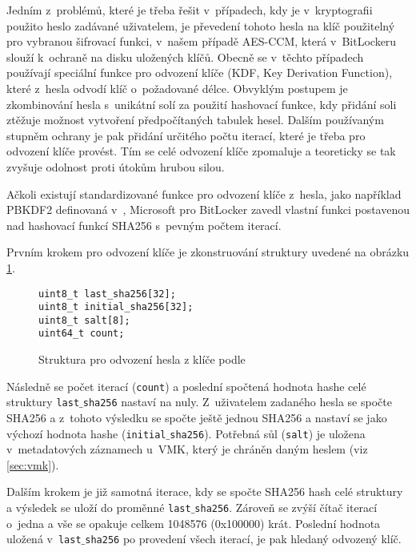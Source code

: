 \label{sec:kdf}

Jedním z~problémů, které je třeba řešit v~případech, kdy je v~kryptografii použito heslo zadávané uživatelem, je převedení tohoto hesla na klíč použitelný pro vybranou šifrovací funkci, v~našem případě AES-CCM, která v~BitLockeru slouží k~ochraně na disku uložených klíčů. Obecně se v~těchto případech používají speciální funkce pro odvození klíče (KDF, Key Derivation Function), které z~hesla odvodí klíč o~požadované délce. Obvyklým postupem je zkombinování hesla s~unikátní solí za použití hashovací funkce, kdy přidání soli ztěžuje možnost vytvoření předpočítaných tabulek hesel. Dalším používaným stupněm ochrany je pak přidání určitého počtu iterací, které je třeba pro odvození klíče provést. Tím se celé odvození klíče zpomaluje a teoreticky se tak zvyšuje odolnost proti útokům hrubou silou.\cite{Kaliski2000}

Ačkoli existují standardizované funkce pro odvození klíče z~hesla, jako například PBKDF2 definovaná v~\cite{Kaliski2000}, Microsoft pro BitLocker zavedl vlastní funkci postavenou nad hashovací funkcí SHA256\cite{FIPS180-4} s~pevným počtem iterací.

Prvním krokem pro odvození klíče je zkonstruování struktury uvedené na obrázku \ref{fig:bitlocker-kdf}.

\begin{figure}[h]
		\centering
		\captionsetup{width=0.65\linewidth}
\begin{lstlisting}[frame=none, escapechar=$, basicstyle=\ttfamily\small, columns=fullflexible, keepspaces=true, xleftmargin=.35\textwidth, xrightmargin=.35\textwidth]
uint8_t last_sha256[32];
uint8_t initial_sha256[32];
uint8_t salt[8];
uint64_t count;
\end{lstlisting}
		\caption{Struktura pro odvození hesla z klíče podle \cite{Metz2011}}
		\label{fig:bitlocker-kdf}
\end{figure}

Následně se počet iterací (\texttt{count}) a poslední spočtená hodnota hashe celé struktury \texttt{last$\_$sha256} nastaví na nuly. Z~uživatelem zadaného hesla se spočte SHA256 a z~tohoto výsledku se spočte ještě jednou SHA256 a nastaví se jako výchozí hodnota hashe (\texttt{initial$\_$sha256}). Potřebná sůl (\texttt{salt}) je uložena v~metadatových záznamech u~VMK, který je chráněn daným heslem (viz \ref{sec:vmk}).

Dalším krokem je již samotná iterace, kdy se spočte SHA256 hash celé struktury a výsledek se uloží do proměnné \texttt{last$\_$sha256}. Zároveň se zvýší čítač iterací o~jedna a vše se opakuje celkem 1048576 (0x100000) krát. Poslední hodnota uložená v~\texttt{last$\_$sha256} po provedení všech iterací, je pak hledaný odvozený klíč.\cite{Metz2011,Agostini2019}

